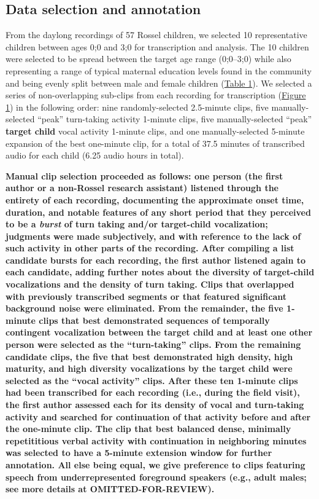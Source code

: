 \documentclass[,man,floatsintext]{apa6}
\begin{document}
\subsection{Data selection and annotation}\label{methods-samples}

From the daylong recordings of 57 Rossel children, we selected 10
representative children between ages 0;0 and 3;0 for transcription and
analysis. The 10 children were selected to be spread between the target
age range (0;0--3;0) while also representing a range of typical maternal
education levels found in the community and being evenly split between
male and female children (\protect\hyperlink{tab1}{Table 1}). We
selected a series of non-overlapping sub-clips from each recording for
transcription (\protect\hyperlink{fig1}{Figure 1}) in the following
order: nine randomly-selected 2.5-minute clips, five manually-selected
\enquote{peak} turn-taking activity 1-minute clips, five
manually-selected \enquote{peak} \textbf{target child} vocal activity
1-minute clips, and one manually-selected 5-minute expansion of the best
one-minute clip, for a total of 37.5 minutes of transcribed audio for
each child (6.25 audio hours in total).

\textbf{Manual clip selection proceeded as follows: one person (the
first author or a non-Rossel research assistant) listened through the
entirety of each recording, documenting the approximate onset time,
duration, and notable features of any short period that they perceived
to be a \emph{burst} of turn taking and/or target-child vocalization;
judgments were made subjectively, and with reference to the lack of such
activity in other parts of the recording. After compiling a list
candidate bursts for each recording, the first author listened again to
each candidate, adding further notes about the diversity of target-child
vocalizations and the density of turn taking. Clips that overlapped with
previously transcribed segments or that featured significant background
noise were eliminated. From the remainder, the five 1-minute clips that
best demonstrated sequences of temporally contingent vocalization
between the target child and at least one other person were selected as
the \enquote{turn-taking} clips. From the remaining candidate clips, the
five that best demonstrated high density, high maturity, and high
diversity vocalizations by the target child were selected as the
\enquote{vocal activity} clips. After these ten 1-minute clips had been
transcribed for each recording (i.e., during the field visit), the first
author assessed each for its density of vocal and turn-taking activity
and searched for continuation of that activity before and after the
one-minute clip. The clip that best balanced dense, minimally
repetititious verbal activity with continuation in neighboring minutes
was selected to have a 5-minute extension window for further annotation.
All else being equal, we give preference to clips featuring speech from
underrepresented foreground speakers (e.g., adult males; see more
details at OMITTED-FOR-REVIEW).}
\end{document}
